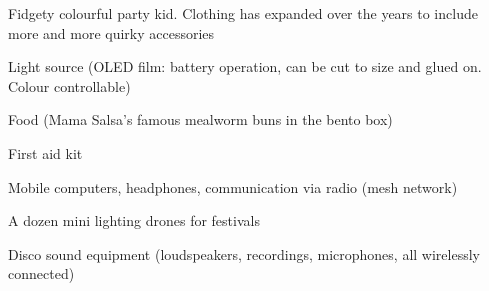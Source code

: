 \begin{npcBox}[title=Disco]
    \begin{consequences}
    \item {}
    \item {}
    \item {}
    \end{consequences}

    \begin{npcDescription}
    Fidgety colourful party kid. Clothing has expanded over the years to include more and more quirky accessories
    \end{npcDescription}


    \begin{equipment}
    \item Light source (OLED film: battery operation, can be cut to size and glued on. Colour controllable)
    \item Food (Mama Salsa's famous mealworm buns in the bento box)
    \item First aid kit
    \item Mobile computers, headphones, communication via radio (mesh network)
    \item A dozen mini lighting drones for festivals
    \item Disco sound equipment (loudspeakers, recordings, microphones, all wirelessly connected)
    \end{equipment}
\end{npcBox}

